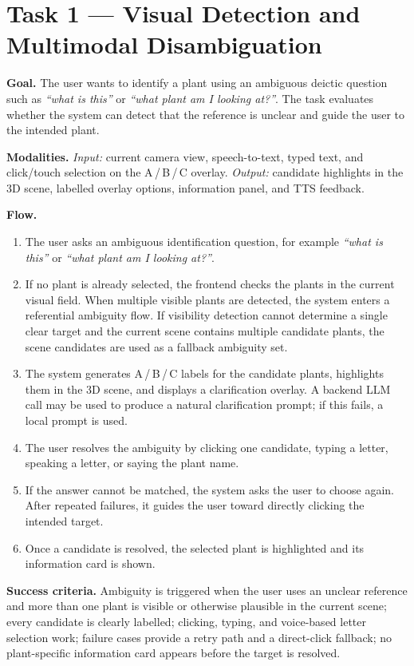 \documentclass[12pt,a4paper]{article}
\newcommand{\tasksub}[1]{\par\smallskip\noindent\textbf{#1}\quad\ignorespaces}
\begin{document}
\section{Task 1 --- Visual Detection and Multimodal Disambiguation}
\tasksub{Goal.} The user wants to identify a plant using an ambiguous
deictic question such as \emph{``what is this''} or \emph{``what plant am I
looking at?''}. The task evaluates whether the system can detect that the
reference is unclear and guide the user to the intended plant.

\tasksub{Modalities.} \emph{Input:} current camera view, speech-to-text,
typed text, and click/touch selection on the A\,/\,B\,/\,C overlay.
\emph{Output:} candidate highlights in the 3D scene, labelled overlay
options, information panel, and TTS feedback.

\tasksub{Flow.}
\begin{enumerate}
    \item The user asks an ambiguous identification question, for example
    \emph{``what is this''} or \emph{``what plant am I looking at?''}.
    \item If no plant is already selected, the frontend checks the plants in
    the current visual field. When multiple visible plants are detected, the
    system enters a referential ambiguity flow. If visibility detection cannot
    determine a single clear target and the current scene contains multiple
    candidate plants, the scene candidates are used as a fallback ambiguity
    set.
    \item The system generates A\,/\,B\,/\,C labels for the candidate plants,
    highlights them in the 3D scene, and displays a clarification overlay.
    A backend LLM call may be used to produce a natural clarification prompt;
    if this fails, a local prompt is used.
    \item The user resolves the ambiguity by clicking one candidate, typing a
    letter, speaking a letter, or saying the plant name.
    \item If the answer cannot be matched, the system asks the user to choose
    again. After repeated failures, it guides the user toward directly
    clicking the intended target.
    \item Once a candidate is resolved, the selected plant is highlighted and
    its information card is shown.
\end{enumerate}

\tasksub{Success criteria.} Ambiguity is triggered when the user uses an
unclear reference and more than one plant is visible or otherwise plausible in
the current scene; every candidate is clearly labelled; clicking, typing, and
voice-based letter selection work; failure cases provide a retry path and a
direct-click fallback; no plant-specific information card appears before the
target is resolved.
\end{document}
